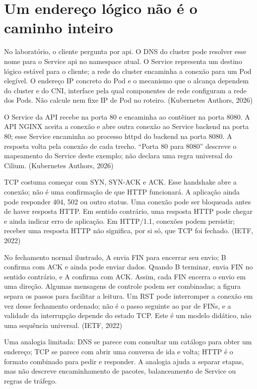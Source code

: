 \documentclass[12pt,openany,oneside,a4paper,chapter=TITLE,english,brazil]{abntex2}
\begin{document}
\FloatBarrier

\section{Um endereço lógico não é o caminho inteiro}\label{um-endereuxe7o-luxf3gico-nuxe3o-uxe9-o-caminho-inteiro}

No laboratório, o cliente pergunta por api. O DNS do cluster pode resolver esse nome para o Service api no namespace atual. O Service representa um destino lógico estável para o cliente; a rede do cluster encaminha a conexão para um Pod elegível. O endereço IP concreto do Pod e o mecanismo que o alcança dependem do cluster e do CNI, interface pela qual componentes de rede configuram a rede dos Pods. Não calcule nem fixe IP de Pod no roteiro. (Kubernetes Authors, 2026)

O Service da API recebe na porta 80 e encaminha ao contêiner na porta 8080. A API NGINX aceita a conexão e abre outra conexão ao Service backend na porta 80; esse Service encaminha ao processo httpd do backend na porta 8080. A resposta volta pela conexão de cada trecho. ``Porta 80 para 8080'' descreve o mapeamento do Service deste exemplo; não declara uma regra universal do Cilium. (Kubernetes Authors, 2026)

TCP costuma começar com SYN, SYN-ACK e ACK. Esse handshake abre a conexão; não é uma confirmação de que HTTP funcionará. A aplicação ainda pode responder 404, 502 ou outro status. Uma conexão pode ser bloqueada antes de haver resposta HTTP. Em sentido contrário, uma resposta HTTP pode chegar e ainda indicar erro de aplicação. Em HTTP/1.1, conexões podem persistir; receber uma resposta HTTP não significa, por si só, que TCP foi fechado. (IETF, 2022)

No fechamento normal ilustrado, A envia FIN para encerrar seu envio; B confirma com ACK e ainda pode enviar dados. Quando B terminar, envia FIN no sentido contrário, e A confirma com ACK. Assim, cada FIN encerra o envio em uma direção. Algumas mensagens de controle podem ser combinadas; a figura separa os passos para facilitar a leitura. Um RST pode interromper a conexão em vez desse fechamento ordenado; não é o passo seguinte ao par de FINs, e a validade da interrupção depende do estado TCP. Este é um modelo didático, não uma sequência universal. (IETF, 2022)

Uma analogia limitada: DNS se parece com consultar um catálogo para obter um endereço; TCP se parece com abrir uma conversa de ida e volta; HTTP é o formato combinado para pedir e responder. A analogia ajuda a separar etapas, mas não descreve encaminhamento de pacotes, balanceamento de Service ou regras de tráfego.
\end{document}

